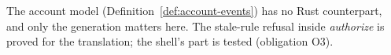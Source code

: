 The account model (Definition~\ref{def:account-events}) has no Rust
counterpart, and only the generation matters here. The stale-rule refusal inside
\textit{authorize} is proved for the translation; the shell's part is tested
(obligation O3).


